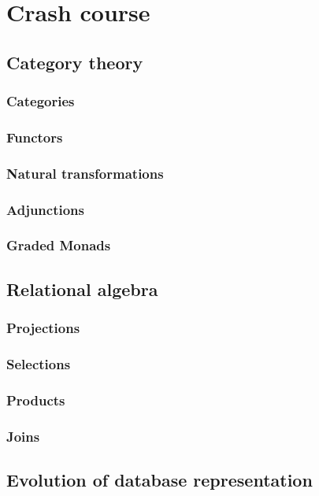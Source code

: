 \section{Crash course}
\subsection{Category theory}
\subsubsection{Categories}
\subsubsection{Functors}
\subsubsection{Natural transformations}
\subsubsection{Adjunctions}
\subsubsection{Graded Monads}

\subsection{Relational algebra}
\subsubsection{Projections}
\subsubsection{Selections}
\subsubsection{Products}
\subsubsection{Joins}

\subsection{Evolution of database representation}
